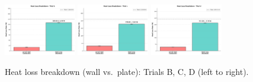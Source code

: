 \documentclass[12pt]{article}
\begin{document}
\begin{figure}[H]
\centering
\includegraphics[width=0.28\textwidth]{graphs/part2_trial_b_loss_breakdown.png}\hfill
\includegraphics[width=0.28\textwidth]{graphs/part2_trial_c_loss_breakdown.png}\hfill
\includegraphics[width=0.28\textwidth]{graphs/part2_trial_d_loss_breakdown.png}
\caption{Heat loss breakdown (wall vs.\ plate): Trials B, C, D (left to right).}
\label{fig:app_breakdown}
\end{figure}
\end{document}
